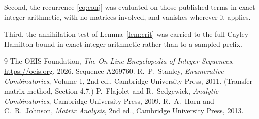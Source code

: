 \documentclass[11pt,a4paper]{article}
\theoremstyle{plain}
\theoremstyle{definition}
\begin{document}
Second, the recurrence \eqref{eq:conj} was evaluated on those published terms in exact
integer arithmetic, with no matrices involved, and vanishes wherever it applies.

Third, the annihilation test of Lemma~\ref{lem:crit} was carried to the full
Cayley--Hamilton bound in exact integer arithmetic rather than to a sampled prefix.

\begin{thebibliography}{9}
 The OEIS Foundation, \emph{The On-Line Encyclopedia of Integer
Sequences}, \url{https://oeis.org}, 2026. Sequence A269760.
 R.~P.~Stanley, \emph{Enumerative Combinatorics}, Volume 1, 2nd ed.,
Cambridge University Press, 2011. (Transfer-matrix method, Section 4.7.)
 P.~Flajolet and R.~Sedgewick, \emph{Analytic Combinatorics}, Cambridge
University Press, 2009.
 R.~A.~Horn and C.~R.~Johnson, \emph{Matrix Analysis}, 2nd ed., Cambridge
University Press, 2013.
\end{thebibliography}
\end{document}

